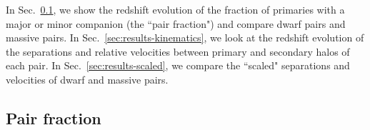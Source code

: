 \documentclass[twocolumn]{aastex631}
\newcommand{\kc}[1]{\textcolor{yellow}{\textbf{kc: #1}} }
\begin{document}
In Sec.~\ref{sec:results-frac}, we show the redshift evolution of the fraction of primaries with a major or minor companion (the ``pair fraction") and compare dwarf pairs and massive pairs.
In Sec.~\ref{sec:results-kinematics}, we look at the redshift evolution of the separations and relative velocities between primary and secondary halos of each pair. %
In Sec.~\ref{sec:results-scaled}, we compare the ``scaled" separations and velocities of dwarf and massive pairs.



\subsection{Pair fraction}\label{sec:results-frac}



\end{document}
